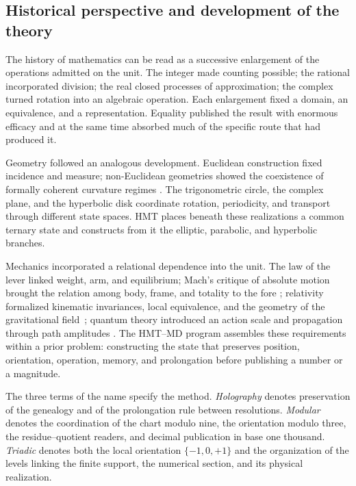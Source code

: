 

\subsection*{Historical perspective and development of the theory}

The history of mathematics can be read as a successive enlargement of the operations admitted on the unit. The integer made counting possible; the rational incorporated division; the real closed processes of approximation; the complex turned rotation into an algebraic operation. Each enlargement fixed a domain, an equivalence, and a representation. Equality published the result with enormous efficacy and at the same time absorbed much of the specific route that had produced it.

Geometry followed an analogous development. Euclidean construction fixed
incidence and measure; non-Euclidean geometries showed the coexistence
of formally coherent curvature regimes
\cite{EuclidElements,PoincareScienceHypothesis}. The trigonometric circle,
the complex plane, and the hyperbolic disk coordinate rotation, periodicity, and
transport through different state spaces. HMT places beneath these
realizations a common ternary state and constructs from it the
elliptic, parabolic, and hyperbolic branches.

Mechanics incorporated a relational dependence into the unit. The law of the
lever linked weight, arm, and equilibrium; Mach's critique of absolute
motion brought the relation among body, frame, and totality to the fore
\cite{ArchimedesEquilibrium,MachMechanics}; relativity formalized kinematic
invariances, local equivalence, and the geometry of the gravitational
field~\cite{Einstein1918Principles}; quantum theory introduced an
action scale and propagation through path amplitudes
\cite{PlanckNobelLecture,Feynman1948}. The HMT--MD program assembles these
requirements within a prior problem: constructing the state that preserves position,
orientation, operation, memory, and prolongation before publishing a number or
a magnitude.

The three terms of the name specify the method. \emph{Holography} denotes preservation of the genealogy and of the prolongation rule between resolutions. \emph{Modular} denotes the coordination of the chart modulo nine, the orientation modulo three, the residue--quotient readers, and decimal publication in base one thousand. \emph{Triadic} denotes both the local orientation \(\{-1,0,+1\}\) and the organization of the levels linking the finite support, the numerical section, and its physical realization.

